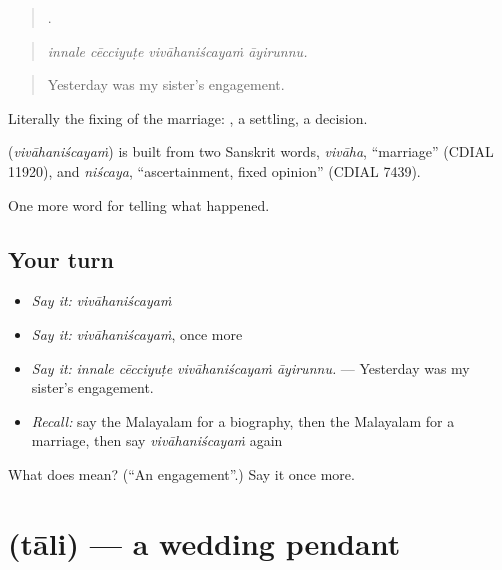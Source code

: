 \begin{quote}
   .
\end{quote}

\begin{quote}
\emph{innale cēcciyuṭe vivāhaniścayaṁ āyirunnu.}
\end{quote}

\begin{quote}
Yesterday was my sister's engagement.
\end{quote}

Literally the fixing of the marriage: , a settling, a decision.

\begin{cousinweb}
\textbf{} (\emph{vivāhaniścayaṁ}) is built from two Sanskrit words, \emph{vivāha}, \textquotedblleft{}marriage\textquotedblright{} (CDIAL 11920), and \emph{niścaya}, \textquotedblleft{}ascertainment, fixed opinion\textquotedblright{} (CDIAL 7439).
\end{cousinweb}

\begin{grammarlens}[title={What you've built}]
One more word for telling what happened.
\end{grammarlens}

\subsection*{Your turn}
\begin{itemize}
\raggedright
  \item \emph{Say it:} \emph{vivāhaniścayaṁ}
  \item \emph{Say it:} \emph{vivāhaniścayaṁ}, once more
  \item \emph{Say it:} \emph{innale cēcciyuṭe vivāhaniścayaṁ āyirunnu.} — Yesterday was my sister's engagement.
  \item \emph{Recall:} say the Malayalam for a biography, then the Malayalam for a marriage, then say \emph{vivāhaniścayaṁ} again
\end{itemize}

\begin{tcolorbox}[breakable,colback=teal!4,colframe=teal!35!black,title={Before you move on}]
What does  mean? (\textquotedblleft{}An engagement\textquotedblright{}.) Say it once more.
\end{tcolorbox}
\section[\texorpdfstring{\ml{താലി} (tāli)}{താലി (tāli)}]{ (tāli) — a wedding pendant}

